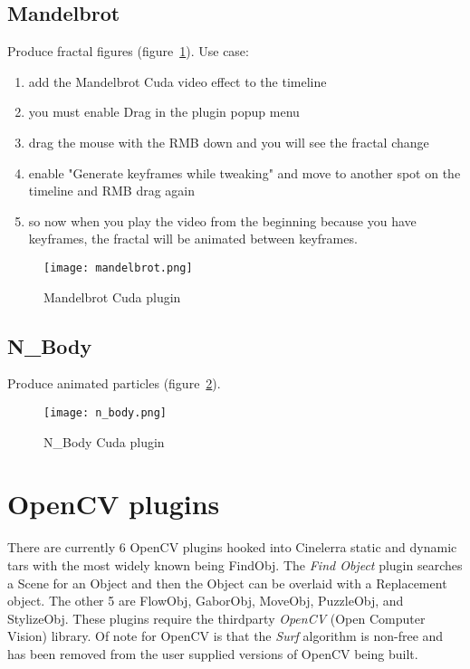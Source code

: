 \subsection{Mandelbrot}%
\label{sub:mandelbrot}

Produce fractal figures (figure~\ref{fig:mandelbrot}). Use case:
\begin{enumerate}
	\item add the Mandelbrot Cuda video effect to the timeline
	\item you must enable Drag in the plugin popup menu
	\item drag the mouse with the RMB down and you will see the fractal change
	\item enable "Generate keyframes while tweaking" and move to another spot on the timeline and RMB drag again
	\item so now when you play the video from the beginning because you have keyframes, the fractal will be animated between keyframes.
\end{enumerate}

\begin{figure}[hbtp]
	\centering
	\texttt{[image: mandelbrot.png]}
	\caption{Mandelbrot Cuda plugin}
	\label{fig:mandelbrot}
\end{figure}

\subsection{N\_Body}%
\label{sub:n_body}

Produce animated particles (figure~\ref{fig:n_body}).

\begin{figure}[hbtp]
	\centering
	\texttt{[image: n\_body.png]}
	\caption{N\_Body Cuda plugin}
	\label{fig:n_body}
\end{figure}

\section{OpenCV plugins}%
\label{sec:opencv_plugins}

There are currently 6 OpenCV plugins hooked into Cinelerra static and dynamic tars with the most
widely known being FindObj.  The \textit{Find Object} plugin searches a Scene for an Object and
then the Object can be overlaid with a Replacement object. The other 5 are FlowObj, GaborObj,
MoveObj, PuzzleObj, and StylizeObj. These  plugins require the thirdparty \textit{OpenCV}
(Open Computer Vision) library.  Of note for OpenCV is that the \textit{Surf} algorithm is non-free
and has been removed from the user supplied versions of OpenCV being built.

